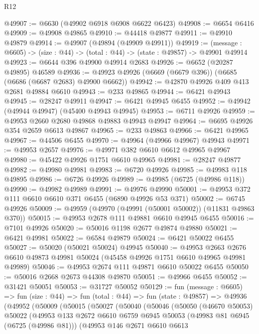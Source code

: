 \begin{lexlean}{R12}
\begin{coremodule}
@49907 := @6630 (@49902 @6918 @6908 @6622 @6423)
@49908 := @6654 @6416
@49909 := @49908 @49865
@49910 := @44418 @49877
@49911 := @49910 @49879
@49914 := @49907 (@49894 (@49909 @49911))
@49919 := (message : @6605) -> (size : @44) -> (total : @44) -> (state : @49857) -> @49901 @49914
@49923 := @6644 @396 @49900 @49914 @2683
@49926 := @6652 (@20287 @49895) @46589
@49936 := @49923 @49926 (@6669 (@6679 @396)) (@6685 (@6686 (@6687 @2683) @49900 @6662))
@49942 := @42870 @49926 @409 @413 @2681 @49884 @6610
@49943 := @233 @49865
@49944 := @6421 @49943
@49945 := @28247 @49911
@49947 := @6421 @49945 @6455
@49952 := @49942 (@49944 @49947) (@45400 @49943 @49945)
@49953 := @6711 @49926
@49959 := @49953 @2660 @2680 @49868 @49883 @49943 @49947
@49964 := @6695 @49926 @354 @2659 @6613 @49867
@49965 := @233 @49863
@49966 := @6421 @49965
@49967 := @44506 @6455
@49970 := @49964 (@49966 @49967) @49943
@49971 := @49953 @2657
@49976 := @49971 @382 @6610 @6612 @49965 @49967
@49980 := @45422 @49926 @1751 @6610 @49965
@49981 := @28247 @49877
@49982 := @49980 @49981
@49983 := @6720 @49926
@49985 := @49983 @118 @49895
@49986 := @6726 @49926
@49989 := @49985 (@6725 (@49986 @118))
@49990 := @49982 @49989
@49991 := @49976 @49990
@50001 := @49953 @372 @111 @6610 @6610 @371 @6455 (@6890 @49926 @53 @371)
@50002 := @6745 @49926
@50009 := @49959 (@49970 (@49991 (@50001 @50002)) (@11831 @49863 @370))
@50015 := @49953 @2678 @111 @49881 @6610 @49945 @6455
@50016 := @7101 @49926
@50020 := @50016 @1198 @2677 @49874 @49880
@50021 := @6421 @49981
@50022 := @6584 @49879
@50024 := @6421 @50022 @6455
@50027 := @50020 (@50021 @50024) @49945
@50040 := @49953
    @2663
    @2676
    @6610
    @49873
    @49981
    @50024
    (@45458 @49926 @1751 @6610 @49965 @49981 @49989)
@50046 := @49953 @2674 @111 @49871 @6610 @50022 @6455
@50050 := @50016 @2668 @2673 @44308 @49870
@50051 := @49966 @6455
@50052 := @31421 @50051
@50053 := @31727 @50052
@50129 := fun (message : @6605) =>
  fun (size : @44) =>
  fun (total : @44) =>
  fun (state : @49857) =>
  @49936
    (@49952
      (@50009
        (@50015
          (@50027
            (@50040
              (@50046
                (@50050
                  (@46670 @50053)
                  @50022
                  (@49953
                    @133
                    @2672
                    @6610
                    @6759
                    @6945
                    @50053
                    (@49983 @81 @6945 (@6725 (@49986 @81)))
                    (@49953
                      @146
                      @2671
                      @6610
                      @6613

\end{coremodule}
\end{lexlean}
